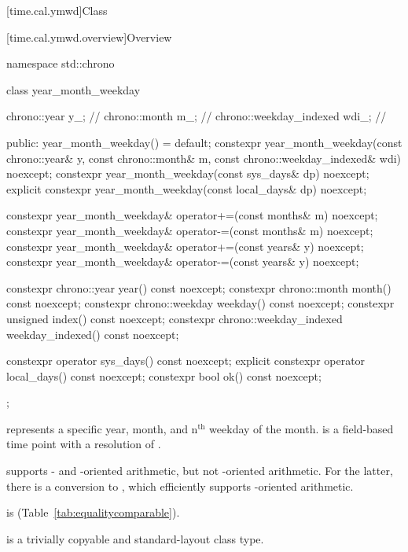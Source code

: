 [time.cal.ymwd]{Class }

[time.cal.ymwd.overview]{Overview}

\begin{codeblock}
namespace std::chrono {
  class year_month_weekday {
    chrono::year            y_;         // \expos
    chrono::month           m_;         // \expos
    chrono::weekday_indexed wdi_;       // \expos

  public:
    year_month_weekday() = default;
    constexpr year_month_weekday(const chrono::year& y, const chrono::month& m,
                                 const chrono::weekday_indexed& wdi) noexcept;
    constexpr year_month_weekday(const sys_days& dp) noexcept;
    explicit constexpr year_month_weekday(const local_days& dp) noexcept;

    constexpr year_month_weekday& operator+=(const months& m) noexcept;
    constexpr year_month_weekday& operator-=(const months& m) noexcept;
    constexpr year_month_weekday& operator+=(const years& y)  noexcept;
    constexpr year_month_weekday& operator-=(const years& y)  noexcept;

    constexpr chrono::year            year()            const noexcept;
    constexpr chrono::month           month()           const noexcept;
    constexpr chrono::weekday         weekday()         const noexcept;
    constexpr unsigned                index()           const noexcept;
    constexpr chrono::weekday_indexed weekday_indexed() const noexcept;

    constexpr          operator sys_days()   const noexcept;
    explicit constexpr operator local_days() const noexcept;
    constexpr bool ok() const noexcept;
  };
}
\end{codeblock}

\pnum
{} represents a specific year, month,
and n$^\textrm{th}$ weekday of the month.
 is a field-based time point with a resolution of .
\begin{note}
 supports - and -oriented arithmetic,
but not -oriented arithmetic.
For the latter, there is a conversion to ,
which efficiently supports -oriented arithmetic.
\end{note}
 is  (Table~\ref{tab:equalitycomparable}).

\pnum
{} is a trivially copyable and standard-layout class type.

